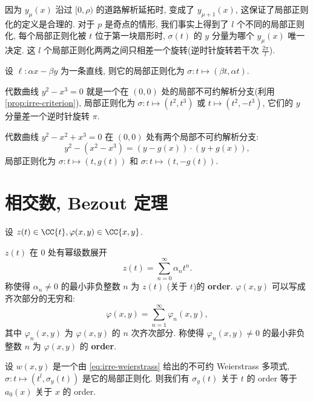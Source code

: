 \begin{rem}
因为 $y_\mu(x)$ 沿过 $[0,\rho)$ 的道路解析延拓时,
变成了 $y_{\mu + 1}(x)$,
这保证了局部正则化的定义是合理的.
对于 $p$ 是奇点的情形,
我们事实上得到了 $l$ 个不同的局部正则化,
每个局部正则化被 $t$ 位于第一块扇形时,
$\sigma(t)$ 的 $y$ 分量为哪个 $y_\mu(x)$ 唯一决定.
这 $l$ 个局部正则化两两之间只相差一个旋转(逆时针旋转若干次 $\frac{2\pi}{l}$).
\end{rem}

\begin{exmp}[直线的正则化]
\label{exmp:line-normalization}
设 $\ell: \alpha x - \beta y$ 为一条直线,
则它的局部正则化为 $\sigma: t \mapsto (\beta t, \alpha t)$.
\end{exmp}

\begin{exmp}
\label{exmp:non-ordinary-normalization}
代数曲线 $y^2 - x^3 = 0$ 就是一个在 $(0,0)$ 处的局部不可约解析分支(利用
\cref{prop:irre-criterion}),
局部正则化为 $\sigma: t \mapsto (t^2, t^3)$ 或 $t \mapsto (t^2, -t^3)$,
它们的 $y$ 分量差一个逆时针旋转 $\pi$.
\end{exmp}

\begin{exmp}
代数曲线 $y^2 - x^2 + x^3 = 0$ 在 $(0,0)$ 处有两个局部不可约解析分支:
\[y^2 - (x^2 - x^3) = (y - g(x))\cdot (y + g(x)),\]
局部正则化为 $\sigma: t \mapsto (t,g(t))$ 和 $\sigma: t \mapsto (t,-g(t))$.
\end{exmp}

\section{相交数, Bezout 定理}

\begin{defin}[order]
\label{defin:order}
设 $z(t)\in \CC\{t\}, \varphi(x,y) \in \CC\{x,y\}$.
\begin{itemize}
    \ii $z(t)$ 在 $0$ 处有幂级数展开
    \[z(t) = \sum_{n=0}^\infty \alpha_nt^n.\]
    称使得 $\alpha_n \ne 0$ 的最小非负整数 $n$ 为 $z(t)$ (关于 $t$)的 \textbf{order}.
    \ii $\varphi(x,y)$ 可以写成齐次部分的无穷和:
    \[\varphi(x,y) = \sum_{n=1}^\infty \varphi_n(x,y),\]
    其中 $\varphi_n(x,y)$ 为 $\varphi(x,y)$ 的 $n$ 次齐次部分.
    称使得 $\varphi_n(x,y) \ne 0$ 的最小非负整数 $n$
    为 $\varphi(x,y)$ 的 \textbf{order}.
\end{itemize}
\end{defin}

\begin{lem}
\label{lem:order-relation}
设 $w(x,y)$ 是一个由 \cref{eq:irre-weierstrass} 给出的不可约 Weierstrass 多项式,
$\sigma: t \mapsto (t^l, \sigma_y(t))$ 是它的局部正则化.
则我们有 $\sigma_y(t)$ 关于 $t$ 的 order
等于 $a_0(x)$ 关于 $x$ 的 order.
\end{lem}

